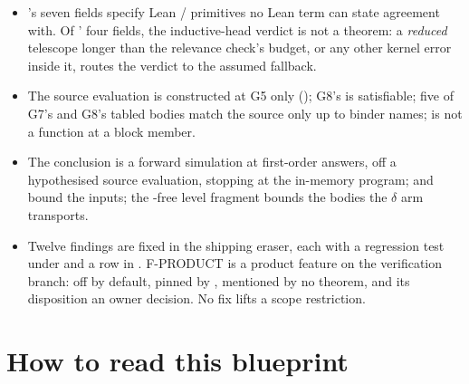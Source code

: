\begin{itemize}
decision on which  the model connection reads, and a length conjunct in
. Deriving it from  and  contradicts  until the
repair.
\item {} 's seven fields specify Lean
/ primitives no Lean term can state agreement with. Of '
four fields, the inductive-head verdict is not a theorem: a \emph{reduced} telescope longer than
the relevance check's budget, or any other kernel error inside it, routes the verdict to the
assumed  fallback.
\item {} The source evaluation  is constructed at G5 only
(); G8's  is satisfiable; five of G7's and G8's tabled bodies
match the source only up to binder names; \Lower{} is not a function at a block member.
\item {} The conclusion is a forward simulation at first-order answers, off a
hypothesised source evaluation, stopping at the in-memory program;  and
 bound the inputs; the -free level fragment bounds the bodies the
$\delta$ arm transports.
\item {} Twelve findings are fixed in the shipping eraser, each with a
regression test under  and a row in . F-PRODUCT
is a product feature on the verification branch: off by default, pinned  by
, mentioned by no theorem, and its disposition an owner decision. No fix lifts a
scope restriction.
\end{itemize}

\section{How to read this blueprint}
\label{sec:intro:legend}

